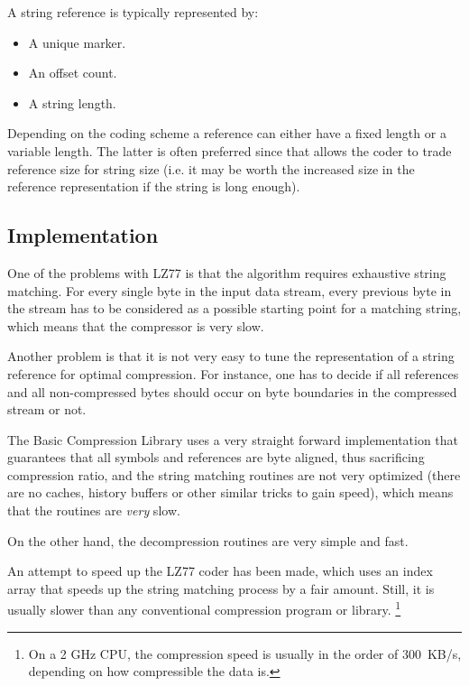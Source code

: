 \documentclass[a4paper,11pt,oneside]{report}
\begin{document}
A string reference is typically represented by:

\begin{itemize}
\item A unique marker.
\item An offset count.
\item A string length.
\end{itemize}

Depending on the coding scheme a reference can either have a fixed
length or a variable length. The latter is often preferred since that
allows the coder to trade reference size for string size (i.e. it may
be worth the increased size in the reference representation if the
string is long enough).


\subsection{Implementation}
One of the problems with LZ77 is that the algorithm requires
exhaustive string matching. For every single byte in the input data
stream, every previous byte in the stream has to be considered as a possible
starting point for a matching string, which means that the compressor is
very slow.

Another problem is that it is not very easy to tune the representation of 
a string reference for optimal compression. For instance, one has to decide
if all references and all non-compressed bytes should occur on byte
boundaries in the compressed stream or not.

The Basic Compression Library uses a very straight forward implementation
that guarantees that all symbols and references are byte aligned, thus
sacrificing compression ratio, and the string matching routines are not
very optimized (there are no caches, history buffers or other similar
tricks to gain speed), which means that the routines are \emph{very} slow.

On the other hand, the decompression routines are very simple and fast.

An attempt to speed up the LZ77 coder has been made, which uses an index
array that speeds up the string matching process by a fair amount. Still,
it is usually slower than any conventional compression program or library.%
\footnote{On a 2 GHz CPU, the compression speed is usually in the order of
300~KB/s, depending on how compressible the data is.}


\end{document}
